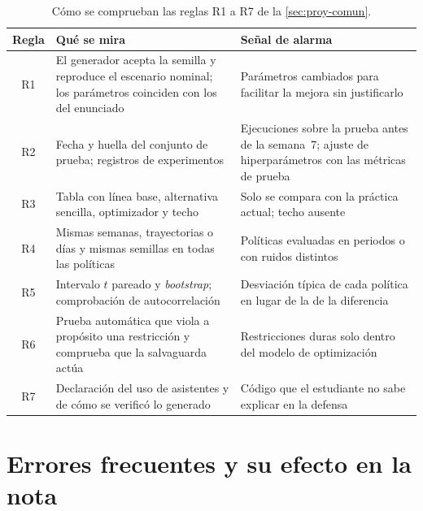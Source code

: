 \begin{table}[H]
\centering\small
\caption{Cómo se comprueban las reglas R1 a R7 de la \cref{sec:proy-comun}.}\label{tab:honesta}
\begin{tabularx}{\textwidth}{@{}c>{\raggedright\arraybackslash}X>{\raggedright\arraybackslash}X@{}}
\toprule
Regla & Qué se mira & Señal de alarma \\
\midrule
R1 & El generador acepta la semilla y reproduce el escenario nominal; los parámetros coinciden con los del enunciado & Parámetros cambiados para facilitar la mejora sin justificarlo \\
R2 & Fecha y huella del conjunto de prueba; registros de experimentos & Ejecuciones sobre la prueba antes de la semana~7; ajuste de hiperparámetros con las métricas de prueba \\
R3 & Tabla con línea base, alternativa sencilla, optimizador y techo & Solo se compara con la práctica actual; techo ausente \\
R4 & Mismas semanas, trayectorias o días y mismas semillas en todas las políticas & Políticas evaluadas en periodos o con ruidos distintos \\
R5 & Intervalo $t$ pareado y \emph{bootstrap}; comprobación de autocorrelación & Desviación típica de cada política en lugar de la de la diferencia \\
R6 & Prueba automática que viola a propósito una restricción y comprueba que la salvaguarda actúa & Restricciones duras solo dentro del modelo de optimización \\
R7 & Declaración del uso de asistentes y de cómo se verificó lo generado & Código que el estudiante no sabe explicar en la defensa \\
\bottomrule
\end{tabularx}
\end{table}

\section{Errores frecuentes y su efecto en la nota}

